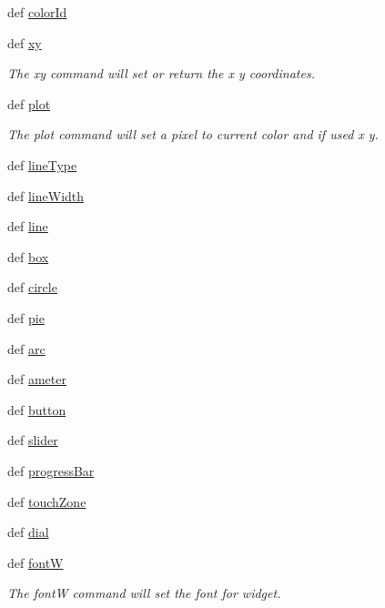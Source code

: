 \begin{DoxyCompactItemize}
def \hyperlink{group___drawing_ga94dd8d046a01670fc2212b548e29e8d0}{color\-Id}
\item 
def \hyperlink{group___drawing_gaf249f02b6ad4e734ffa9d8371f6cab8a}{xy}
\begin{DoxyCompactList}\small\item\em The xy command will set or return the x y coordinates. \end{DoxyCompactList}\item 
def \hyperlink{group___drawing_gad3c0ce418a0feea4a0fa40f803c90196}{plot}
\begin{DoxyCompactList}\small\item\em The plot command will set a pixel to current color and if used x y. \end{DoxyCompactList}\item 
def \hyperlink{group___drawing_ga9dc821ce2652535899c584d4ff1c1bf7}{line\-Type}
\item 
def \hyperlink{group___drawing_ga87b2625e7e4ffa927b4471003f8c6e70}{line\-Width}
\item 
def \hyperlink{group___drawing_gae70c22a0a810a70a0dd6d32c9fd7c066}{line}
\item 
def \hyperlink{group___drawing_ga63bb01e1f5ef0fe2ae2acec0ed90e5bd}{box}
\item 
def \hyperlink{group___drawing_gabfcfb31f2d88c7397332abcc6b324c7c}{circle}
\item 
def \hyperlink{group___drawing_ga12fb93d2d6f7ce3f08ad988c09624d57}{pie}
\item 
def \hyperlink{group___drawing_ga13a0a8fb9c906a687f2a42864d973cc1}{arc}
\item 
def \hyperlink{group___widgets_ga01020dc360dfbd9f463bf5478e42566e}{ameter}
\item 
def \hyperlink{group___widgets_ga7eeeb3ce522c7891c3f76cdc79f11192}{button}
\item 
def \hyperlink{group___widgets_gafce5d2b8d149e7d84a27ca9740baefe3}{slider}
\item 
def \hyperlink{group___widgets_ga1e17ba92ebcd90504fdc0f8fddb84bf0}{progress\-Bar}
\item 
def \hyperlink{group___widgets_ga7a2150ae399ca581088ac55f421731cb}{touch\-Zone}
\item 
def \hyperlink{group___widgets_ga8691bfb0f80929f4b4e09a83697532b8}{dial}
\item 
def \hyperlink{group___widgets_gae5afb2a11476aad1d2cc0293d8e68717}{font\-W}
\begin{DoxyCompactList}\small\item\em The font\-W command will set the font for widget. \end{DoxyCompactList}\item 

\end{DoxyCompactItemize}
